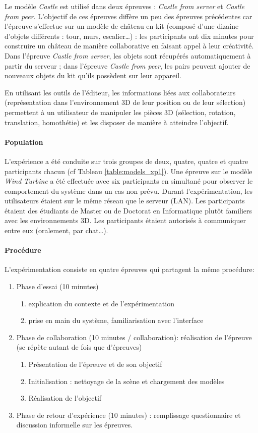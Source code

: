 Le modèle \textit{Castle} est utilisé dans deux épreuves : 
\textit{Castle from server} et \textit{Castle from peer}. L'objectif de ces épreuves
diffère un peu des épreuves précédentes car l'épreuve s'effectue sur un  modèle 
de château en kit (composé d'une dizaine d'objets différents : tour, murs, 
escalier\dots) : les 
participants ont dix minutes pour construire un 
château de manière collaborative en faisant appel à leur créativité. 
Dans l'épreuve \textit{Castle from server}, les objets sont récupérés 
automatiquement à partir du serveur ; 
dans l'épreuve \textit{Castle from peer}, les pairs peuvent ajouter de nouveaux 
objets du kit qu'ils possèdent sur leur appareil.

En utilisant les outils de l'éditeur, les informations liées aux collaborateurs 
(représentation dans l'environnement \gls{3D} de leur position ou de leur sélection) permettent à un 
utilisateur de manipuler les pièces 3D (sélection, rotation, translation, 
homothétie) et les disposer de manière à atteindre l'objectif. 
\paragraph{Population}
L'expérience a été conduite sur trois groupes de deux, quatre, quatre et quatre 
participants chacun (cf Tableau \ref{table:models_xp1}). Une épreuve sur le 
modèle \textit{Wind Turbine} a été effectuée avec six participants 
en simultané pour observer le comportement du système dans un cas non prévu.
Durant l'expérimentation, les utilisateurs étaient sur le même réseau que le serveur 
(\gls{LAN}). 
Les participants étaient des étudiants de Master ou de Doctorat en Informatique 
plutôt familiers avec les environnements \gls{3D}. Les participants étaient 
autorisés à 
communiquer entre eux (oralement, par chat\dots).
\paragraph{Procédure}
L'expérimentation consiste en quatre épreuves qui partagent la même procédure:
\begin{enumerate}
	\item Phase d'essai (10 minutes)
	\begin{enumerate}
		\item explication du contexte et de l'expérimentation 
		\item prise en main du système, familiarisation avec 
		l'interface 
	\end{enumerate}
	\item Phase de collaboration (10 minutes / collaboration): réalisation de 
	l'épreuve (se répète autant de fois 
	que d'épreuves)
	\begin{enumerate}
		\item Présentation de l'épreuve et de son objectif
		\item Initialisation : nettoyage de la scène et chargement des modèles
		\item Réalisation de l'objectif
	\end{enumerate}
	\item Phase de retour d'expérience (10 minutes) : remplissage questionnaire et 
	discussion 
	informelle sur les épreuves.
\end{enumerate}

